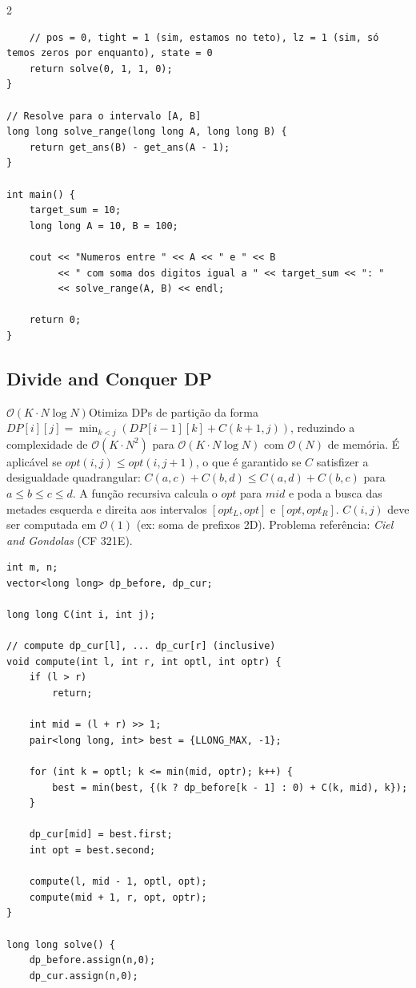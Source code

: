 \documentclass[11pt]{article}
\begin{document}
\begin{multicols}{2}
\begin{lstlisting}
    // pos = 0, tight = 1 (sim, estamos no teto), lz = 1 (sim, só temos zeros por enquanto), state = 0
    return solve(0, 1, 1, 0);
}

// Resolve para o intervalo [A, B]
long long solve_range(long long A, long long B) {
    return get_ans(B) - get_ans(A - 1);
}

int main() {
    target_sum = 10;
    long long A = 10, B = 100;
    
    cout << "Numeros entre " << A << " e " << B 
         << " com soma dos digitos igual a " << target_sum << ": " 
         << solve_range(A, B) << endl;
         
    return 0;
}
\end{lstlisting}

\subsection{Divide and Conquer DP}
$\mathcal{O}(K \cdot N \log N)$Otimiza DPs de partição da forma $DP[i][j] = \min_{k < j}(DP[i-1][k] + C(k+1, j))$, reduzindo a complexidade de $\mathcal{O}(K \cdot N^2)$ para $\mathcal{O}(K \cdot N \log N)$ com $\mathcal{O}(N)$ de memória. É aplicável se $opt(i, j) \le opt(i, j+1)$, o que é garantido se $C$ satisfizer a desigualdade quadrangular: $C(a, c) + C(b, d) \le C(a, d) + C(b, c)$ para $a \le b \le c \le d$. A função recursiva calcula o $opt$ para $mid$ e poda a busca das metades esquerda e direita aos intervalos $[opt_L, opt]$ e $[opt, opt_R]$. $C(i, j)$ deve ser computada em $\mathcal{O}(1)$ (ex: soma de prefixos 2D). Problema referência: \textit{Ciel and Gondolas} (CF 321E).
\begin{lstlisting}
int m, n;
vector<long long> dp_before, dp_cur;

long long C(int i, int j);

// compute dp_cur[l], ... dp_cur[r] (inclusive)
void compute(int l, int r, int optl, int optr) {
    if (l > r)
        return;

    int mid = (l + r) >> 1;
    pair<long long, int> best = {LLONG_MAX, -1};

    for (int k = optl; k <= min(mid, optr); k++) {
        best = min(best, {(k ? dp_before[k - 1] : 0) + C(k, mid), k});
    }

    dp_cur[mid] = best.first;
    int opt = best.second;

    compute(l, mid - 1, optl, opt);
    compute(mid + 1, r, opt, optr);
}

long long solve() {
    dp_before.assign(n,0);
    dp_cur.assign(n,0);


\end{lstlisting}
\end{multicols}
\end{document}
